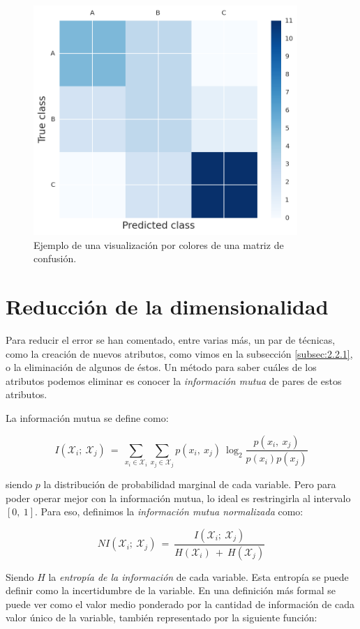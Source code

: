 \begin{figure}[H]
  \centering
  \includegraphics[width=100mm]{figures/ch_03/confusion_matrix_example.png}
  \caption{Ejemplo de una visualización por colores de una matriz de confusión.}
  \label{fig:3.11}
\end{figure}

\section{Reducción de la dimensionalidad} \label{sec:3.3}

Para reducir el error se han comentado, entre varias más, un par de técnicas, como la creación de nuevos atributos, como vimos en la subsección \ref{subsec:2.2.1}, o la eliminación de algunos de éstos. Un método para saber cuáles de los atributos podemos eliminar es conocer la \emph{información mutua} de pares de estos atributos.

La información mutua se define como:

$$
I(\mathcal{X}_{i};\:\mathcal{X}_{j})\:=\:\sum_{x_{i}\in\mathcal{X}_{i}}\sum_{x_{j}\in\mathcal{X}_{j}}p(x_{i},\:x_{j})\:\log_{2}\frac{p(x_{i},\:x_{j})}{p(x_{i})p(x_{j})}
$$

\noindent
siendo $p$ la distribución de probabilidad marginal de cada variable. Pero para poder operar mejor con la información mutua, lo ideal es restringirla al intervalo $[0,\:1]$. Para eso, definimos la \emph{información mutua normalizada} como:

$$
NI(\mathcal{X}_{i};\:\mathcal{X}_{j})\:=\:\frac{I(\mathcal{X}_{i};\:\mathcal{X}_{j})}{H(\mathcal{X}_{i})\:+\:H(\mathcal{X}_{j})}
$$

Siendo $H$ la \emph{entropía de la información} de cada variable. Esta entropía se puede definir como la incertidumbre de la variable. En una definición más formal se puede ver como el valor medio ponderado por la cantidad de información de cada valor único de la variable, también representado por la siguiente función:


